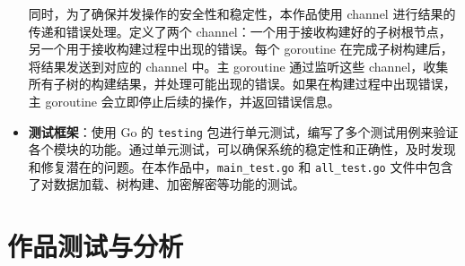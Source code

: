 \documentclass{cumcmthesis}
\numberwithin{equation}{section} %
\numberwithin{figure}{section} %
\numberwithin{table}{section} %
\begin{document}
\begin{itemize}
    同时，为了确保并发操作的安全性和稳定性，本作品使用 channel 进行结果的传递和错误处理。定义了两个 channel：一个用于接收构建好的子树根节点，另一个用于接收构建过程中出现的错误。每个 goroutine 在完成子树构建后，将结果发送到对应的 channel 中。主 goroutine 通过监听这些 channel，收集所有子树的构建结果，并处理可能出现的错误。如果在构建过程中出现错误，主 goroutine 会立即停止后续的操作，并返回错误信息。
    \item \textbf{测试框架}：使用 Go 的 \texttt{testing} 包进行单元测试，编写了多个测试用例来验证各个模块的功能。通过单元测试，可以确保系统的稳定性和正确性，及时发现和修复潜在的问题。在本作品中，\texttt{main\_test.go} 和 \texttt{all\_test.go} 文件中包含了对数据加载、树构建、加密解密等功能的测试。
\end{itemize}

\newpage

\section{作品测试与分析}
\end{document}
